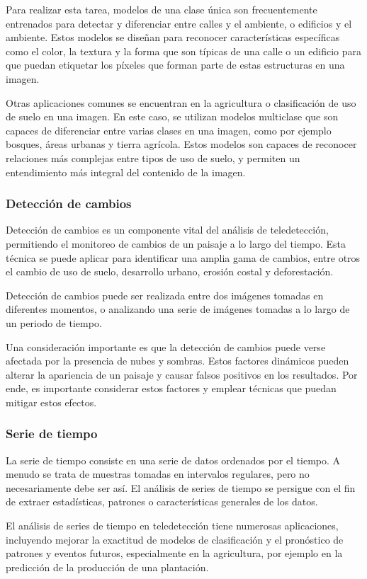 Para realizar esta tarea, modelos de una clase única son frecuentemente entrenados para detectar y diferenciar entre
calles y el ambiente, o edificios y el ambiente. Estos modelos se diseñan para reconocer características específicas
como el color, la textura y la forma que son típicas de una calle o un edificio para que puedan etiquetar los píxeles
que forman parte de estas estructuras en una imagen. \autocite{cole-segmentation}

Otras aplicaciones comunes se encuentran en la agricultura o clasificación de uso de suelo en una imagen. En este caso,
se utilizan modelos multiclase que son capaces de diferenciar entre varias clases en una imagen, como por ejemplo
bosques, áreas urbanas y tierra agrícola. Estos modelos son capaces de reconocer relaciones más complejas entre tipos
de uso de suelo, y permiten un entendimiento más integral del contenido de la imagen. \autocite{cole-segmentation}

\subsubsection{Detección de cambios}

Detección de cambios es un componente vital del análisis de teledetección, permitiendo el monitoreo de cambios de un
paisaje a lo largo del tiempo. Esta técnica se puede aplicar para identificar una amplia gama de cambios, entre otros
el cambio de uso de suelo, desarrollo urbano, erosión costal y deforestación. \autocite{repo-satellite-image-dl}

Detección de cambios puede ser realizada entre dos imágenes tomadas en diferentes momentos, o analizando una serie de
imágenes tomadas a lo largo de un periodo de tiempo. \autocite{repo-satellite-image-dl}

Una consideración importante es que la detección de cambios puede verse afectada por la presencia de nubes y sombras.
Estos factores dinámicos pueden alterar la apariencia de un paisaje y causar falsos positivos en los resultados. Por
ende, es importante considerar estos factores y emplear técnicas que puedan mitigar estos efectos.
\autocite{repo-satellite-image-dl}

\subsubsection{Serie de tiempo}

La serie de tiempo consiste en una serie de datos ordenados por el tiempo. A menudo se trata de muestras tomadas en
intervalos regulares, pero no necesariamente debe ser así. El análisis de series de tiempo se persigue con el fin de
extraer estadísticas, patrones o características generales de los datos.

El análisis de series de tiempo en teledetección tiene numerosas aplicaciones, incluyendo mejorar la exactitud de
modelos de clasificación y el pronóstico de patrones y eventos futuros, especialmente en la agricultura, por
ejemplo en la predicción de la producción de una plantación. \autocite{repo-satellite-image-dl}
